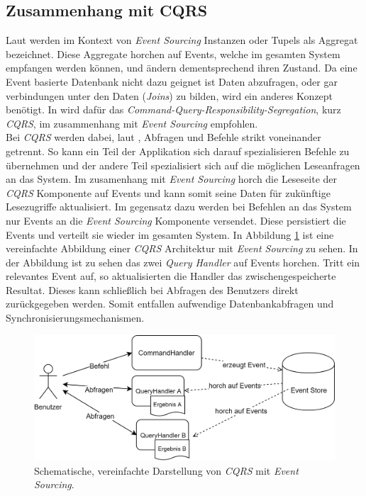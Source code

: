 \subsection{Zusammenhang mit CQRS}
Laut \cite{vernon2013implementing} werden im Kontext von \textit{Event Sourcing} Instanzen oder Tupels als Aggregat bezeichnet. Diese Aggregate horchen auf  Events, welche im gesamten System empfangen werden können, und ändern dementsprechend ihren Zustand. Da eine Event basierte Datenbank nicht dazu geignet ist Daten abzufragen, oder gar verbindungen unter den Daten (\textit{Joins}) zu bilden, wird ein anderes Konzept benötigt. In \cite{vernon2013implementing} wird dafür das \textit{Command-Query-Responsibility-Segregation}, kurz \textit{CQRS}, im zusammenhang mit \textit{Event Sourcing} empfohlen. \\
Bei \textit{CQRS} werden dabei, laut \cite{cqrsYoung2010}, Abfragen und  Befehle strikt voneinander getrennt. So kann ein Teil der Applikation sich darauf spezialisieren Befehle zu übernehmen und der andere Teil spezialisiert sich auf die möglichen Leseanfragen an das System. Im zusamenhang mit \textit{Event Sourcing} horch die Leseseite der \textit{CQRS} Komponente auf Events und kann somit seine Daten für zukünftige Lesezugriffe aktualisiert. Im gegensatz dazu werden bei Befehlen an das System nur Events an die \textit{Event Sourcing} Komponente versendet. Diese persistiert die Events und verteilt sie wieder im gesamten System. In Abbildung \ref{fig:transactionTheory:eventSourcing:cqrs} ist eine vereinfachte Abbildung einer \textit{CQRS} Architektur mit \textit{Event Sourcing} zu sehen. In der Abbildung ist zu sehen das zwei \textit{Query Handler} auf Events horchen. Tritt ein relevantes Event auf, so aktualisierten die Handler das zwischengespeicherte Resultat. Dieses kann schließlich bei Abfragen des Benutzers direkt zurückgegeben werden. Somit entfallen aufwendige Datenbankabfragen und Synchronisierungsmechanismen. \\
\begin{figure}
    \centering
    \includegraphics[width=\linewidth]{gfx/other/eventSourcingCqrs}
    \caption{Schematische, vereinfachte Darstellung von \textit{CQRS} mit \textit{Event Sourcing}.}
    \label{fig:transactionTheory:eventSourcing:cqrs}
\end{figure}
